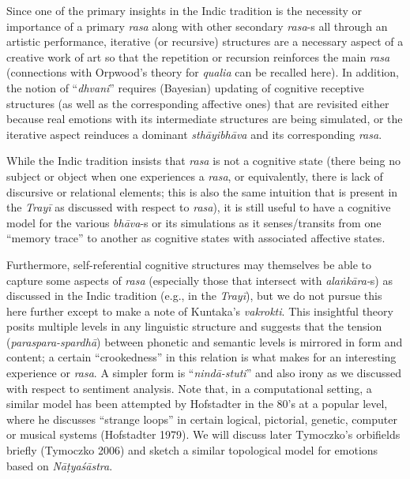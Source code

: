 Since one of the primary insights in the Indic tradition is the necessity or importance of a primary \textsl{rasa} along with other secondary \textsl{rasa}-s all through an artistic performance, iterative (or recursive) structures are a necessary aspect of a creative work of art so that the repetition or recursion reinforces the main \textsl{rasa} (connections with Orpwood’s theory for \textsl{qualia} can be recalled here). In addition, the notion of “\textsl{dhvani}” requires (Bayesian) updating of cognitive receptive structures (as well as the corresponding affective ones) that are revisited either because real emotions with its intermediate structures are being simulated, or the iterative aspect reinduces a dominant \textsl{sthāyibhāva} and its corresponding \textsl{rasa}.

While the Indic tradition insists that \textsl{rasa} is not a cognitive state (there being no subject or object when one experiences a \textsl{rasa}, or equivalently, there is lack of discursive or relational elements; this is also the same intuition that is present in the \textsl{Trayī} as discussed with respect to \textsl{rasa}), it is still useful to have a cognitive model for the various \textsl{bhāva}-s or its simulations as it senses/transits from one “memory trace” to another as cognitive states with associated affective states.

Furthermore, self-referential cognitive structures may themselves be able to capture some aspects of \textsl{rasa} (especially those that intersect with \textsl{alaṅkāra-}s) as discussed in the Indic tradition (e.g., in the \textsl{Trayī}), but we do not pursue this here further except to make a note of Kuntaka's \textsl{vakrokti}. This insightful theory posits multiple levels in any linguistic structure and suggests that the tension (\textsl{paraspara-spardhā}) between phonetic and semantic levels is mirrored in form and content; a certain “crookedness” in this relation is what makes for an interesting experience or \textsl{rasa}. A simpler form is “\textsl{nindā-stuti}” and also irony as we discussed with respect to sentiment analysis. Note that, in a computational setting, a similar model has been attempted by Hofstadter in the 80's at a popular level, where he discusses “strange loops” in certain logical, pictorial, genetic, computer or musical systems (Hofstadter 1979). We will discuss later Tymoczko’s orbifields briefly (Tymoczko 2006) and sketch a similar topological model for emotions based on \textsl{Nāṭyaśāstra}.
\vskip 2.2pt

